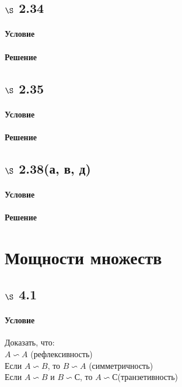 \documentclass[a4paper,12pt]{article}
\begin{document}
\subsection*{$\S$ 2.34}
\paragraph*{Условие}
\paragraph*{Решение}

\subsection*{$\S$ 2.35}
\paragraph*{Условие}
\paragraph*{Решение}

\subsection*{$\S$ 2.38(а, в, д)}
\paragraph*{Условие}
\paragraph*{Решение}

\section{Мощности множеств}
\subsection*{$\S$ 4.1}
\paragraph*{Условие}
Доказать, что:\\
$ A \backsim A $ (рефлексивность)\\
Если $ A \backsim B $, то $ B \backsim A $ (симметричность)\\
Если $ A \backsim B $ и $ B \backsim С $, то $ A \backsim С $(транзетивность)\\
\end{document}
